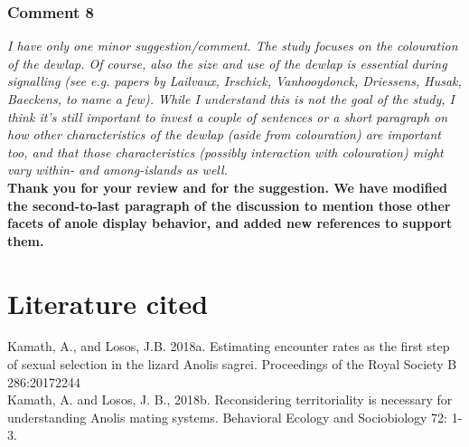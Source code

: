 \documentclass{article}
\begin{document}
	\subsubsection*{Comment 8}
	
	\textit{I have only one minor suggestion/comment. The study focuses on the colouration of the dewlap. Of course, also the size and use of the dewlap is essential during signalling (see e.g. papers by Lailvaux, Irschick, Vanhooydonck, Driessens, Husak, Baeckens, to name a few). While I understand this is not the goal of the study, I think it’s still important to invest a couple of sentences or a short paragraph on how other characteristics of the dewlap (aside from colouration) are important too, and that those characteristics (possibly interaction with colouration) might vary within- and among-islands as well.}\\
	
	\textbf{Thank you for your review and for the suggestion. We have modified the second-to-last paragraph of the discussion to mention those other facets of anole display behavior, and added new references to support them.}
	
	\pagebreak
	
	\section*{Literature cited}
	
	Kamath, A., and Losos, J.B. 2018a. Estimating encounter rates as the first step of sexual selection in the lizard Anolis sagrei. Proceedings of the Royal Society B 286:20172244\\
	
	Kamath, A. and Losos, J. B., 2018b. Reconsidering territoriality is necessary for understanding Anolis mating systems. Behavioral Ecology and Sociobiology 72: 1-3.\\
	
\end{document}
